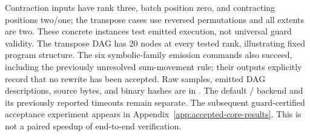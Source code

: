 Contraction inputs have rank three, batch position zero, and contracting positions two/one; the transpose cases use reversed permutations and all extents are two. These concrete instances test emitted execution, not universal guard validity. The transpose DAG has 20 nodes at every tested rank, illustrating fixed program structure. The six symbolic-family emission commands also succeed, including the previously unresolved sum-movement rule; their outputs explicitly record that no rewrite has been accepted.
Raw samples, emitted DAG descriptions, source bytes, and binary hashes are in . The default / backend and its previously reported timeouts remain separate. The subsequent guard-certified  acceptance experiment appears in Appendix~\ref{app:accepted-core-results}. This is not a paired speedup of end-to-end verification.
